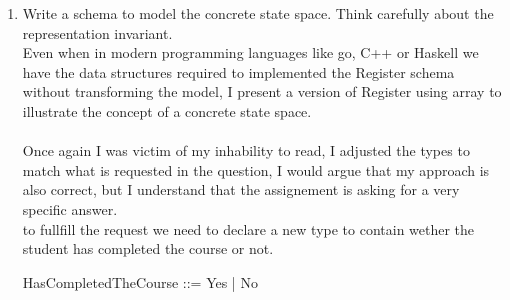\documentclass{article}
\begin{document}
\begin{enumerate}
\item Write a schema to model the concrete state space. Think
  carefully about the representation invariant.
  \color{blue}
  \\
  Even when in modern programming languages like go, C++ or Haskell we have the data structures required
  to implemented the Register schema without transforming the model, I present a version of Register using array to illustrate the concept of a concrete state space. \\
  \\
  Once again I was victim of my inhability to read, I adjusted the types to match what is requested in the question, I would argue that my approach is also correct, but I understand that the assignement is asking for a very specific answer. \\
  to fullfill the request we need to declare a new type to contain wether the student has completed the course or not. \\
  \begin{zed}
  HasCompletedTheCourse ::= Yes | No 
\end{zed}
  

\end{enumerate}
\end{document}
